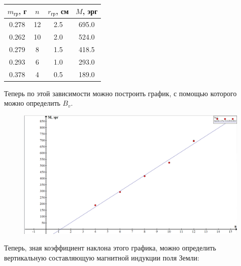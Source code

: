 \begin{table}[h]
\begin{center}
\begin{tabular}{|c|c|c|c|}
\hline
\rowcolor[HTML]{9698ED} 
$m_{\text{гр}}$, г & $n$ & $r_{\text{гр}}$, см & $M$, эрг     \\ \hline
0.278           & 12  & 2.5               & 695.0  \\ \hline
\rowcolor[HTML]{9698ED} 
0.262           & 10  & 2.0             & 524.0 \\ \hline
0.279           & 8   & 1.5             & 418.5 \\ \hline
\rowcolor[HTML]{9698ED} 
0.293           & 6   & 1.0             & 293.0 \\ \hline
0.378           & 4   & 0.5             & 189.0   \\ \hline
\end{tabular}
\end{center}
\end{table}

Теперь по этой зависимости можно построить график, с помощью которого можно определить $B_v$.

\begin{figure}[h!]
\begin{center}
\includegraphics[width=1\textwidth]{pics/lab1232.png}
\end{center}
\end{figure}

Теперь, зная коэффициент наклона этого графика, можно определить вертикальную составляющую магнитной индукции поля Земли:

